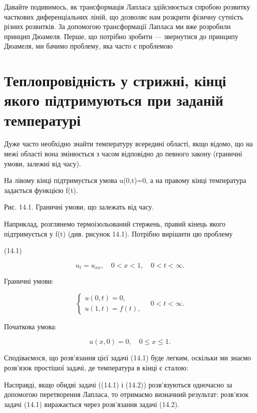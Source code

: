 \documentclass[
  ukrainian,
]{article}
\begin{document}
Давайте подивимось, як трансформація Лапласа здійснюється спробою
розвитку часткових диференціальних ліній, що дозволяє нам розкрити
фізичну сутність різних розвитків. За допомогою трансформації Лапласа ми
вже розробили принцип Дюамеля. Перше, що потрібно зробити --- звернутися
до принципу Дюамеля, ми бачимо проблему, яка часто є проблемою

\section{Теплопровідність у стрижні, кінці якого підтримуються при
заданій
температурі}\label{ux442ux435ux43fux43bux43eux43fux440ux43eux432ux456ux434ux43dux456ux441ux442ux44c-ux443-ux441ux442ux440ux438ux436ux43dux456-ux43aux456ux43dux446ux456-ux44fux43aux43eux433ux43e-ux43fux456ux434ux442ux440ux438ux43cux443ux44eux442ux44cux441ux44f-ux43fux440ux438-ux437ux430ux434ux430ux43dux456ux439-ux442ux435ux43cux43fux435ux440ux430ux442ux443ux440ux456}

Дуже часто необхідно знайти температуру всередині області, якщо відомо,
що на межі області вона змінюється з часом відповідно до певного закону
(граничні умови, залежні від часу).

На лівому кінці підтримується умова u(0,t)=0, а на правому кінці
температура задається функцією f(t).

Рис. 14.1. Граничні умови, що залежать від часу.

Наприклад, розглянемо термоізольований стержень, правий кінець якого
підтримується у f(t) (див. рисунок 14.1). Потрібно вирішити цю проблему

(14.1)

\[
u_t = u_{xx}, \quad 0 < x < 1, \quad 0 < t < \infty.
\]

Граничні умови:

\[
\begin{cases}
u(0, t) = 0, \\
u(1, t) = f(t),
\end{cases}
\quad 0 < t < \infty.
\]

Початкова умова:

\[
u(x, 0) = 0, \quad 0 \le x \le 1.
\]

Сподіваємося, що розв'язання цієї задачі (14.1) буде легким, оскільки ми
знаємо розв'язок простішої задачі, де температура в кінці є сталою:

Насправді, якщо обидві задачі ((14.1) і (14.2)) розв'язуються одночасно
за допомогою перетворення Лапласа, то отримаємо визначний результат:
розв'язок задачі (14.1) виражається через розв'язання задачі (14.2).
\end{document}
